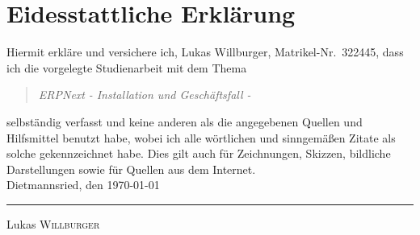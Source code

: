 \chapter{Eidesstattliche Erklärung}
Hiermit erkläre und versichere ich, Lukas Willburger, Matrikel-Nr.\ 322445, dass ich die vorgelegte Studienarbeit mit dem Thema
\begin{quote}
\textit{ERPNext} \textit{- Installation und Geschäftsfall -}
\end{quote}
selbständig verfasst und keine anderen als die angegebenen Quellen und Hilfsmittel benutzt habe, wobei ich alle wörtlichen und sinngemäßen Zitate als solche gekennzeichnet habe.  Dies gilt auch für Zeichnungen, Skizzen, bildliche Darstellungen sowie für Quellen aus dem Internet.
\\[6ex]

Dietmannsried, den \today \\


\rule[-0.2cm]{5cm}{0.5pt}

Lukas \textsc{Willburger} 
